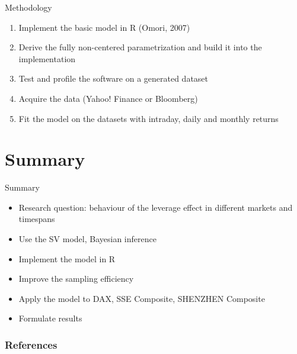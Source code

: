 \documentclass[notes]{beamer}       %
\begin{document}
\begin{frame}{Methodology}
\begin{enumerate}
\item Implement the basic model in R (Omori, 2007)
\item Derive the fully non-centered parametrization and build it into the implementation
\item Test and profile the software on a generated dataset
\item Acquire the data (Yahoo! Finance or Bloomberg)
\item Fit the model on the datasets with intraday, daily and monthly returns
\end{enumerate}
\end{frame}

\section*{Summary}

\begin{frame}{Summary}
\begin{itemize}
\item Research question: behaviour of the leverage effect in different markets and timespans
\item Use the SV model, Bayesian inference
\item Implement the model in R
\item Improve the sampling efficiency
\item Apply the model to DAX, SSE Composite, SHENZHEN Composite
\item Formulate results
\end{itemize}
\end{frame}

\begin{frame}[shrink]
\frametitle{References}


\nocite{shen2009cross,kastner2014ancillarity,omori2007stochastic,jacquier2004bayesian,mccausland2011simulation}
\end{frame}
\end{document}
